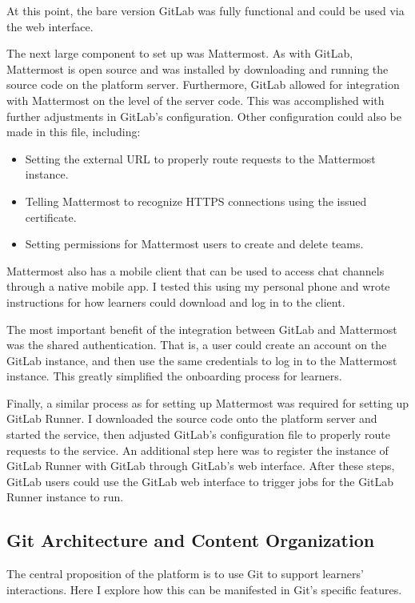 \documentclass[12pt,twoside]{mitthesis}
\begin{document}
At this point, the bare version GitLab was fully functional and could be used via the web interface.

The next large component to set up was Mattermost. As with GitLab, Mattermost is open source and was installed by downloading and running the source code on the platform server. Furthermore, GitLab allowed for integration with Mattermost on the level of the server code. This was accomplished with further adjustments in GitLab's configuration. Other configuration could also be made in this file, including:
\begin{itemize}
\item Setting the external URL to properly route requests to the Mattermost instance.
\item Telling Mattermost to recognize HTTPS connections using the issued certificate.
\item Setting permissions for Mattermost users to create and delete teams.
\end{itemize}
Mattermost also has a mobile client that can be used to access chat channels through a native mobile app. I tested this using my personal phone and wrote instructions for how learners could download and log in to the client.

The most important benefit of the integration between GitLab and Mattermost was the shared authentication. That is, a user could create an account on the GitLab instance, and then use the same credentials to log in to the Mattermost instance. This greatly simplified the onboarding process for learners.

Finally, a similar process as for setting up Mattermost was required for setting up GitLab Runner. I downloaded the source code onto the platform server and started the service, then adjusted GitLab's configuration file to properly route requests to the service. An additional step here was to register the instance of GitLab Runner with GitLab through GitLab's web interface. After these steps, GitLab users could use the GitLab web interface to trigger jobs for the GitLab Runner instance to run.

\subsection{Git Architecture and Content Organization}

The central proposition of the platform is to use Git to support learners' interactions. Here I explore how this can be manifested in Git's specific features.
\end{document}
